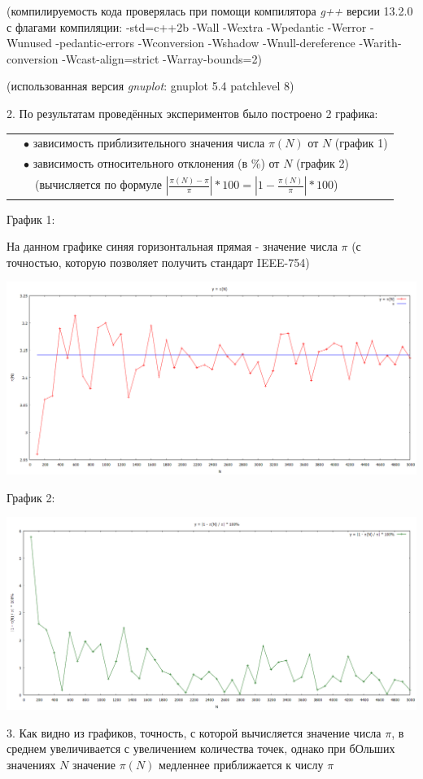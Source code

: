 \documentclass[11pt,a4paper]{article}
\begin{document}
(компилируемость кода проверялась при помощи компилятора \textit{g++} версии 13.2.0 с флагами компиляции:
-std=c++2b -Wall -Wextra -Wpedantic -Werror -Wunused -pedantic-errors -Wconversion -Wshadow -Wnull-dereference -Warith-conversion -Wcast-align=strict -Warray-bounds=2)

(использованная версия \textit{gnuplot}: gnuplot 5.4 patchlevel 8)

\pagebreak

2. По результатам проведённых экспериментов было построено 2 графика:

\begin{tabular}{rl}
    & $\bullet$ зависимость приблизительного значения числа $\pi(N)$ от $N$ (график 1) \\
    & $\bullet$ зависимость относительного отклонения (в \%) от $N$ (график 2) \\ 
    & \,\,\,\, (вычисляется по формуле $ \left| \frac{\pi(N) - \pi}{\pi} \right| * 100 = \left| 1 - \frac{\pi(N)}{\pi} \right| * 100 $) \\
\end{tabular}

График 1:

На данном графике синяя горизонтальная прямая - значение числа $ \pi $ (с точностью, которую позволяет получить стандарт IEEE-754)

\hspace*{-2cm} \includegraphics[scale=0.5]{pi_values_graph.PNG}

График 2:

\hspace*{-2cm} \includegraphics[scale=0.5]{percentage_diff_graph.PNG}

3. Как видно из графиков, точность, с которой вычисляется значение числа $\pi$, в среднем увеличивается 
с увеличением количества точек, однако при бОльших значениях $N$ значение $\pi(N)$ медленнее приближается к числу $\pi$
\end{document}
